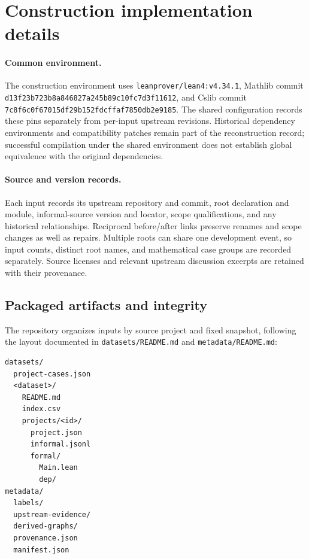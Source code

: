 \section{Construction implementation details}
\label{app:implementation}

\paragraph{Common environment.}
The construction environment uses \texttt{leanprover/lean4:v4.34.1}, Mathlib commit \nolinkurl{d13f23b723b8a846827a245b89c10fc7d3f11612}, and Cslib commit \nolinkurl{7c8f6c0f67015df29b152fdcffaf7850db2e9185}. The shared configuration records these pins separately from per-input upstream revisions. Historical dependency environments and compatibility patches remain part of the reconstruction record; successful compilation under the shared environment does not establish global equivalence with the original dependencies.

\paragraph{Source and version records.}
Each input records its upstream repository and commit, root declaration and module, informal-source version and locator, scope qualifications, and any historical relationships. Reciprocal before/after links preserve renames and scope changes as well as repairs. Multiple roots can share one development event, so input counts, distinct root names, and mathematical case groups are recorded separately. Source licenses and relevant upstream discussion excerpts are retained with their provenance.

\subsection{Packaged artifacts and integrity}
\label{app:data-package}

The repository organizes inputs by source project and fixed snapshot, following the layout documented in \texttt{datasets/README.md} and \texttt{metadata/README.md}:
\begin{verbatim}
datasets/
  project-cases.json
  <dataset>/
    README.md
    index.csv
    projects/<id>/
      project.json
      informal.jsonl
      formal/
        Main.lean
        dep/
metadata/
  labels/
  upstream-evidence/
  derived-graphs/
  provenance.json
  manifest.json
\end{verbatim}

